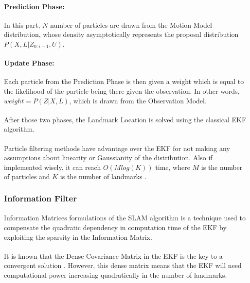 \documentclass[11pt]{article}
\begin{document}
	 \paragraph{Prediction Phase:} In this part, $N$ number of particles are drawn from the Motion Model distribution, whose density asymptotically represents the proposal distribution $P(X, L | Z_{0:i-1}, U)$.
	 
	 \paragraph{Update Phase:} Each particle from the Prediction Phase is then given a weight which is equal to the likelihood of the particle being there given the observation. In other words, $weight = P(Z|X, L)$, which is drawn from the Observation Model.
	 
	 \paragraph{}
	 After those two phases, the Landmark Location is solved using the classical EKF algorithm.
	 
	 \paragraph{}
	 Particle filtering methods have advantage over the EKF for not making any assumptions about linearity or Gaussianity of the distribution. Also if implemented wisely, it can reach $O(Mlog(K))$ time, where $M$ is the number of particles and $K$ is the number of landmarks \cite{Montemerlo02fastslam:a}.
	 
	 
	
	\subsubsection{Information Filter}
	\paragraph{}
	Information Matrices formulations of the SLAM algorithm is a technique used to compensate the quadratic dependency in computation time of the EKF by exploiting the sparsity in the Information Matrix.
	\paragraph{}
	It is known that the Dense Covariance Matrix in the EKF is the key to a convergent solution \cite{SLAMPartI}. However, this dense matrix means that the EKF will need computational power increasing quadratically in the number of landmarks.
	
\end{document}
